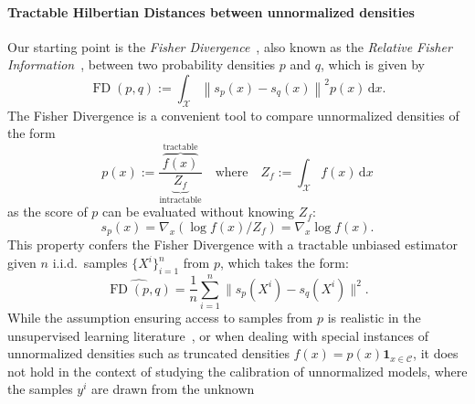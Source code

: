 \documentclass{uai2023} %
\begin{document}
\paragraph{Tractable Hilbertian Distances between unnormalized densities}

Our starting point is the
\emph{Fisher Divergence}~\citep{lyu2012interpretation,sriperumbudur2017density,hyvarinen2005estimation}, also known as the \emph{Relative Fisher Information}~\citep{otto2000generalization}, between two probability densities $ p $ and $ q $, which is given by
\begin{equation*}\label{eq:fd}
    \operatorname{FD}(p, q) := \int_{\mathcal  X} \left \| s_p(x) - s_q(x)  \right \|^2 p(x) \,\mathrm{d}x.
\end{equation*}
The Fisher Divergence is a convenient tool to compare unnormalized densities of the form
\begin{equation*}
p(x):= \frac{ \overbrace{f(x)}^{\text{tractable}} }{ \underbrace{Z_f}_{\text{intractable}} } \quad \text{where} \quad Z_f:= \int_{\mathcal  X} f(x) \,\mathrm{d}x
\end{equation*}
as the score of $ p $ can be evaluated without knowing $ Z_f $:
\begin{equation*}
    s_p(x) = \nabla_{x} (\log f(x)/{Z_f}) = \nabla_{x} \log f(x).
\end{equation*}
This property confers the Fisher Divergence with a tractable unbiased
estimator given $ n $ i.i.d.\ samples $ \{X^{i}
\}_{i=1}^{n} $ from $ p $, which takes the form:
\begin{equation*}
    \widehat{\operatorname{FD}(p, q) } = \frac{1}{n} \sum_{i=1}^{n} \|  s_p(X^{i}) - s_q(X^{i})  \|^2.
\end{equation*}
While the assumption
ensuring access to samples from $ p $ is realistic in the unsupervised learning
literature~\citep{hyvarinen2005estimation}, or when dealing with special
instances of unnormalized densities such as truncated densities $ f(x) = p(x)\textbf{1}_{x \in
\mathcal  C}  $, it does not hold in the context of studying the calibration of
unnormalized models, where the samples $ y^{i} $ are drawn from the unknown
\end{document}

